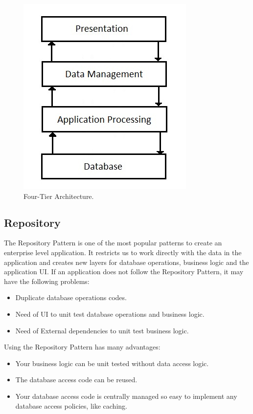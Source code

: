 \documentclass{article}
\begin{document}
\begin{figure}[h]
\centering
\includegraphics[scale=0.9]{4t.jpg}
\caption{Four-Tier Architecture.}
\label{fig_4t}
\end{figure}

\subsection{Repository}
The Repository Pattern is one of the most popular patterns to create an enterprise level application. It restricts us to work directly with the data in the application and creates new layers for database operations, business logic and the application UI. If an application does not follow the Repository Pattern, it may have the following problems:

\begin{itemize}

\item Duplicate database operations codes.
\item Need of UI to unit test database operations and business logic.
\item Need of External dependencies to unit test business logic.

\end{itemize}

\noindent Using the Repository Pattern has many advantages:
\begin{itemize}

\item Your business logic can be unit tested without data access logic.
\item The database access code can be reused.
\item Your database access code is centrally managed so easy to implement any database access policies, like caching.

\end{itemize}
\end{document}
